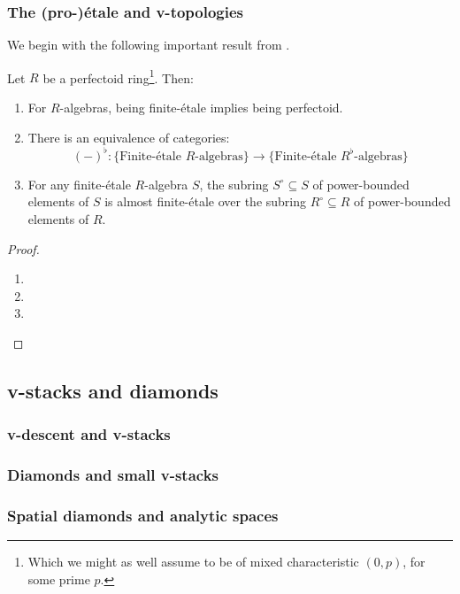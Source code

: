         \subsubsection{The (pro-)\'etale and v-topologies}
            We begin with the following important result from \cite{scholze2011perfectoid}.
            \begin{theorem} \label{theorem: almost_purity_perfectoid_version}
                Let $R$ be a perfectoid ring\footnote{Which we might as well assume to be of mixed characteristic $(0, p)$, for some prime $p$.}. Then:
                    \begin{enumerate}
                        \item For $R$-algebras, being finite-\'etale implies being perfectoid.
                        \item There is an equivalence of categories:
                            $$(-)^{\flat}: \{\text{Finite-\'etale $R$-algebras}\} \to \{\text{Finite-\'etale $R^{\flat}$-algebras}\}$$
                        \item For any finite-\'etale $R$-algebra $S$, the subring $S^{\circ} \subseteq S$ of power-bounded elements of $S$ is almost finite-\'etale over the subring $R^{\circ} \subseteq R$ of power-bounded elements of $R$.
                    \end{enumerate}
            \end{theorem}
                \begin{proof}
                    \noindent
                    \begin{enumerate}
                        \item 
                        \item 
                        \item 
                    \end{enumerate}
                \end{proof}
            \begin{definition} \label{def: etale_morphisms_of_perfectoid_spaces}
                
            \end{definition}
    
    \subsection{v-stacks and diamonds}
        \subsubsection{v-descent and v-stacks}
        
        \subsubsection{Diamonds and small v-stacks}
        
        \subsubsection{Spatial diamonds and analytic spaces}